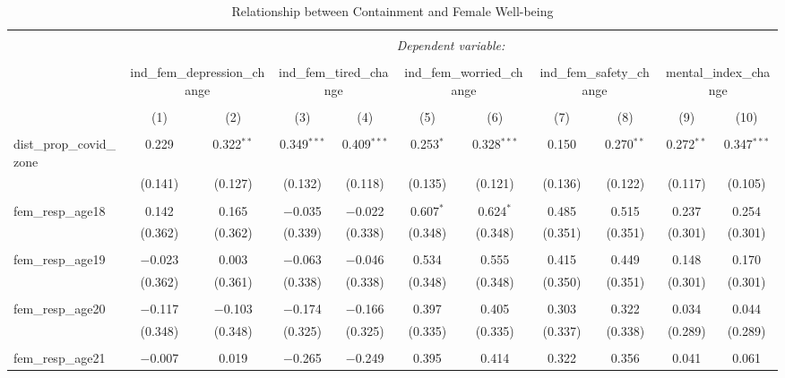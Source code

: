
\begin{table}[!htbp] \centering 
  \caption{Relationship between Containment and Female Well-being} 
  \label{} 
\begin{tabular}{@{\extracolsep{5pt}}lcccccccccc} 
\\[-1.8ex]\hline 
\hline \\[-1.8ex] 
 & \multicolumn{10}{c}{\textit{Dependent variable:}} \\ 
\cline{2-11} 
\\[-1.8ex] & \multicolumn{2}{c}{ind\_fem\_depression\_change} & \multicolumn{2}{c}{ind\_fem\_tired\_change} & \multicolumn{2}{c}{ind\_fem\_worried\_change} & \multicolumn{2}{c}{ind\_fem\_safety\_change} & \multicolumn{2}{c}{mental\_index\_change} \\ 
\\[-1.8ex] & (1) & (2) & (3) & (4) & (5) & (6) & (7) & (8) & (9) & (10)\\ 
\hline \\[-1.8ex] 
 dist\_prop\_covid\_zone & 0.229 & 0.322$^{**}$ & 0.349$^{***}$ & 0.409$^{***}$ & 0.253$^{*}$ & 0.328$^{***}$ & 0.150 & 0.270$^{**}$ & 0.272$^{**}$ & 0.347$^{***}$ \\ 
  & (0.141) & (0.127) & (0.132) & (0.118) & (0.135) & (0.121) & (0.136) & (0.122) & (0.117) & (0.105) \\ 
  & & & & & & & & & & \\ 
 fem\_resp\_age18 & 0.142 & 0.165 & $-$0.035 & $-$0.022 & 0.607$^{*}$ & 0.624$^{*}$ & 0.485 & 0.515 & 0.237 & 0.254 \\ 
  & (0.362) & (0.362) & (0.339) & (0.338) & (0.348) & (0.348) & (0.351) & (0.351) & (0.301) & (0.301) \\ 
  & & & & & & & & & & \\ 
 fem\_resp\_age19 & $-$0.023 & 0.003 & $-$0.063 & $-$0.046 & 0.534 & 0.555 & 0.415 & 0.449 & 0.148 & 0.170 \\ 
  & (0.362) & (0.361) & (0.338) & (0.338) & (0.348) & (0.348) & (0.350) & (0.351) & (0.301) & (0.301) \\ 
  & & & & & & & & & & \\ 
 fem\_resp\_age20 & $-$0.117 & $-$0.103 & $-$0.174 & $-$0.166 & 0.397 & 0.405 & 0.303 & 0.322 & 0.034 & 0.044 \\ 
  & (0.348) & (0.348) & (0.325) & (0.325) & (0.335) & (0.335) & (0.337) & (0.338) & (0.289) & (0.289) \\ 
  & & & & & & & & & & \\ 
 fem\_resp\_age21 & $-$0.007 & 0.019 & $-$0.265 & $-$0.249 & 0.395 & 0.414 & 0.322 & 0.356 & 0.041 & 0.061 \\ 

\end{tabular}
\end{table}
